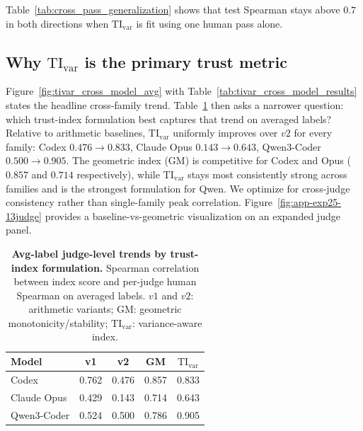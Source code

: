 \documentclass{article}
\begin{document}
Table~\ref{tab:cross_pass_generalization} shows that test Spearman stays above \(0.7\) in both directions when \(\mathrm{TI}_{\mathrm{var}}\) is fit using one human pass alone.

\subsection{Why \texorpdfstring{\(\mathrm{TI}_{\mathrm{var}}\)}{TI-var} is the primary trust metric}
Figure~\ref{fig:tivar_cross_model_avg} with Table~\ref{tab:tivar_cross_model_results} states the headline cross-family trend. Table~\ref{tab:cross_model_index_compare_avg} then asks a narrower question: which trust-index formulation best captures that trend on averaged labels? Relative to arithmetic baselines, \(\mathrm{TI}_{\mathrm{var}}\) uniformly improves over \(v2\) for every family: Codex \(0.476\!\rightarrow\!0.833\), Claude Opus \(0.143\!\rightarrow\!0.643\), Qwen3-Coder \(0.500\!\rightarrow\!0.905\). The geometric index (GM) is competitive for Codex and Opus (\(0.857\) and \(0.714\) respectively), while \(\mathrm{TI}_{\mathrm{var}}\) stays most consistently strong across families and is the strongest formulation for Qwen. We optimize for cross-judge consistency rather than single-family peak correlation. Figure~\ref{fig:app-exp25-13judge} provides a baseline-vs-geometric visualization on an expanded judge panel.

\begin{table}[t]
  \centering
  \small
  \begin{tabular}{lcccc}
    \toprule
    \textbf{Model} & \textbf{v1} & \textbf{v2} & \textbf{GM} & $\mathrm{TI}_{\mathrm{var}}$ \\
    \midrule
    Codex          & 0.762       & 0.476       & 0.857       & 0.833                        \\
    Claude Opus    & 0.429       & 0.143       & 0.714       & 0.643                        \\
    Qwen3-Coder    & 0.524       & 0.500       & 0.786       & 0.905                        \\
    \bottomrule
  \end{tabular}
  \caption{\textbf{Avg-label judge-level trends by trust-index formulation.}
  Spearman correlation between index score and per-judge human Spearman on averaged labels.
  \(v1\) and \(v2\): arithmetic variants; GM: geometric monotonicity/stability; \(\mathrm{TI}_{\mathrm{var}}\): variance-aware index.}
  \label{tab:cross_model_index_compare_avg}
\end{table}
\end{document}
